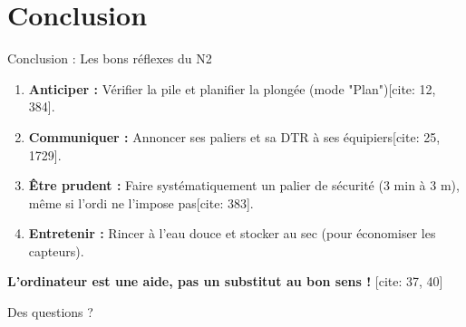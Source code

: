 \section{Conclusion}

\begin{frame}{Conclusion : Les bons réflexes du N2}
    \begin{enumerate}
        \item \textbf{Anticiper :} Vérifier la pile et planifier la plongée (mode "Plan")[cite: 12, 384].
        \item \textbf{Communiquer :} Annoncer ses paliers et sa DTR à ses équipiers[cite: 25, 1729].
        \item \textbf{Être prudent :} Faire systématiquement un palier de sécurité (3 min à 3 m), même si l'ordi ne l'impose pas[cite: 383].
        \item \textbf{Entretenir :} Rincer à l'eau douce et stocker au sec (pour économiser les capteurs).
    \end{enumerate}
    \vspace{0.4cm}
    \centering \textbf{L'ordinateur est une aide, pas un substitut au bon sens !} [cite: 37, 40]
\end{frame}

\begin{frame}
    \centering
    \Huge{Des questions ?}
\end{frame}